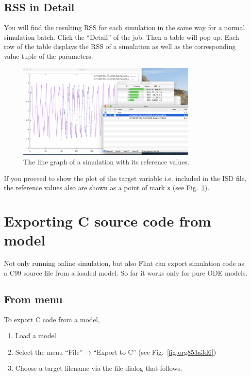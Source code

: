 \documentclass[a4paper,10pt]{report}
\begin{document}
\subsection{RSS in Detail}
\label{sec:org0ef98f1}
You will find the resulting RSS for each simulation in the same way for a normal
simulation batch. Click the ``Detail'' of the job. Then a table will pop up.
Each row of the table displays the RSS of a simulation as well as the
corresponding value tuple of the parameters.

\begin{figure}[htbp]
\centering
\includegraphics[width=0.8\textwidth]{image/parameter-fitting-plot.png}
\caption{\label{fig:orgfe277ae}The line graph of a simulation with its reference values.}
\end{figure}

If you proceed to show the plot of the target variable i.e. included in the ISD
file, the reference values also are shown as a point of mark \texttt{x} (see
Fig.~\ref{fig:orgfe277ae}).

\section{Exporting C source code from model}
\label{sec:orgbe6b7d7}
Not only running online simulation, but also Flint can export simulation code
as a C99 source file from a loaded model. So far it works only for pure ODE models.

\subsection{From menu}
\label{sec:org086dafd}
To export C code from a model,

\begin{enumerate}
\item Load a model
\item Select the menu ``File''\(\to\)``Export to C'' (see Fig.~\ref{fig:org853a3d6})
\item Choose a target filename via the file dialog that follows.
\end{enumerate}
\end{document}
